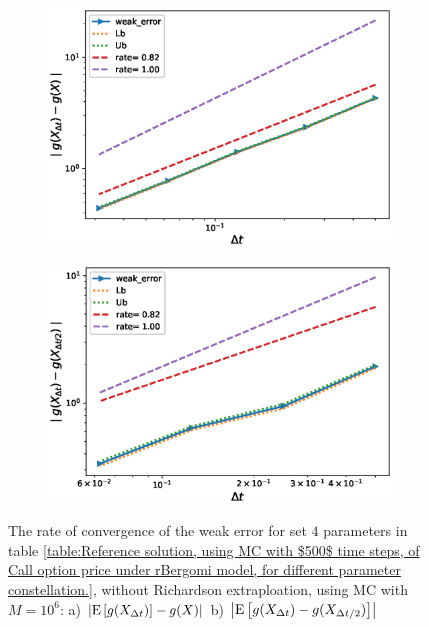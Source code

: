 \documentclass[11pt]{article}
\newcommand{\expt}[1]{\mathrm{E}\left[#1\right]}
\begin{document}
\begin{figure}[!htbp]
	\centering
	\begin{subfigure}{.4\textwidth}
		\centering
		\includegraphics[width=1\linewidth]{./figures/rBergomi_weak_error_rates/without_richardson/H_007/weak_convergence_order_Bergomi_H_007_K_12_M_10_6_CI_relative}
		\caption{}
		\label{fig:sub3}
	\end{subfigure}%
	\begin{subfigure}{.4\textwidth}
		\centering
		\includegraphics[width=1\linewidth]{./figures/rBergomi_weak_error_rates/without_richardson/H_007/weak_convergence_order_differences_Bergomi_H_007_K_12_M_10_6_CI_relative}
		\caption{}
		\label{fig:sub4}
	\end{subfigure}
	
	\caption{The rate of convergence of the weak error for set $4$ parameters in table \ref{table:Reference solution, using MC with $500$ time steps, of Call option price under rBergomi model, for different parameter constellation.}, without Richardson extraploation, using MC with $M=10^6$: a) $\abs{\expt{g(X_{\Delta t})}-g(X)}$  b) $\abs{\expt{g(X_{\Delta t})-g(X_{\Delta t/2})}}$ }
	\label{fig:Weak_rate_H_007_without_rich_K_12}
\end{figure}
\end{document}
